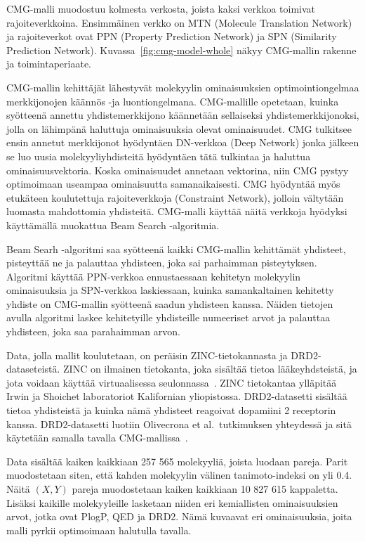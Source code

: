 \documentclass[finnish,twoside,censored,tkt,sw-line]{HYthesisML}
\begin{document}
CMG-malli muodostuu kolmesta verkosta, joista kaksi verkkoa toimivat rajoiteverkkoina.
Ensimmäinen verkko on MTN (Molecule Translation Network) ja rajoiteverkot ovat PPN (Property Prediction Network) ja SPN (Similarity Prediction Network).
Kuvassa~\ref{fig:cmg-model-whole} näkyy CMG-mallin rakenne ja toimintaperiaate.

CMG-mallin kehittäjät lähestyvät molekyylin ominaisuuksien optimointiongelmaa merkkijonojen käännös -ja luontiongelmana.
CMG-mallille opetetaan, kuinka syötteenä annettu yhdistemerkkijono käännetään sellaiseksi yhdistemerkkijonoksi, jolla on lähimpänä haluttuja ominaisuuksia olevat ominaisuudet.
CMG tulkitsee ensin annetut merkkijonot hyödyntäen DN-verkkoa (Deep Network) jonka jälkeen se luo uusia molekyyliyhdisteitä hyödyntäen tätä tulkintaa ja haluttua ominaisuusvektoria.
Koska ominaisuudet annetaan vektorina, niin CMG pystyy optimoimaan useampaa ominaisuutta samanaikaisesti.
CMG hyödyntää myös etukäteen koulutettuja rajoiteverkkoja (Constraint Network), jolloin vältytään luomasta mahdottomia yhdisteitä.
CMG-malli käyttää näitä verkkoja hyödyksi käyttämällä muokattua Beam Search -algoritmia.

Beam Searh -algoritmi saa syötteenä kaikki CMG-mallin kehittämät yhdisteet, pisteyttää ne ja palauttaa yhdisteen, joka sai parhaimman pisteytyksen.
Algoritmi käyttää PPN-verkkoa ennustaessaan kehitetyn molekyylin ominaisuuksia ja SPN-verkkoa laskiessaan, kuinka samankaltainen kehitetty yhdiste on CMG-mallin syötteenä saadun yhdisteen kanssa.
Näiden tietojen avulla algoritmi laskee kehitetyille yhdisteille numeeriset arvot ja palauttaa yhdisteen, joka saa parahaimman arvon.

Data, jolla mallit koulutetaan, on peräisin ZINC-tietokannasta ja DRD2-dataseteistä.
ZINC on ilmainen tietokanta, joka sisältää tietoa lääkeyhdsteistä, ja jota voidaan käyttää virtuaalisessa seulonnassa~\cite{ZINC}.
ZINC tietokantaa ylläpitää Irwin ja Shoichet laboratoriot Kalifornian yliopistossa.
DRD2-datasetti sisältää tietoa yhdisteistä ja kuinka nämä yhdisteet reagoivat dopamiini 2 receptorin kanssa.
DRD2-datasetti luotiin Olivecrona et al.\ tutkimuksen yhteydessä ja sitä käytetään samalla tavalla CMG-mallissa~\cite{ShinBonggun}.

Data sisältää kaiken kaikkiaan 257 565 molekyyliä, joista luodaan pareja.
Parit muodostetaan siten, että kahden molekyylin välinen tanimoto-indeksi on yli 0.4.
Näitä \((X,Y)\) pareja muodostetaan kaiken kaikkiaan 10 827 615 kappaletta.
Lisäksi kaikille molekyyleille lasketaan niiden eri kemiallisten ominaisuuksien arvot, jotka ovat PlogP, QED ja DRD2.
Nämä kuvaavat eri ominaisuuksia, joita malli pyrkii optimoimaan halutulla tavalla.
\end{document}
